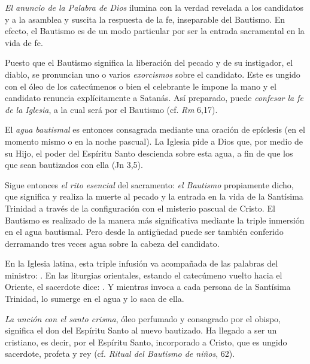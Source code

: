 \begin{ccebody}
 \textit{El anuncio de la Palabra de Dios} ilumina con la verdad revelada a los candidatos y a la asamblea y suscita la respuesta de la fe, inseparable del Bautismo. En efecto, el Bautismo es de un modo particular  por ser la entrada sacramental en la vida de fe.

 Puesto que el Bautismo significa la liberación del pecado y de su instigador, el diablo, se pronuncian uno o varios \textit{exorcismos} sobre el candidato. Este es ungido con el óleo de los catecúmenos o bien el celebrante le impone la mano y el candidato renuncia explícitamente a Satanás. Así preparado, puede \textit{confesar la fe de la Iglesia}, a la cual será  por el Bautismo (cf. \textit{Rm} 6,17).

 El \textit{agua bautismal} es entonces consagrada mediante una oración de epíclesis (en el momento mismo o en la noche pascual). La Iglesia pide a Dios que, por medio de su Hijo, el poder del Espíritu Santo descienda sobre esta agua, a fin de que los que sean bautizados con ella  (Jn 3,5).

 Sigue entonces \textit{el rito esencial} del sacramento: \textit{el Bautismo} propiamente dicho, que significa y realiza la muerte al pecado y la entrada en la vida de la Santísima Trinidad a través de la configuración con el misterio pascual de Cristo. El Bautismo es realizado de la manera más significativa mediante la triple inmersión en el agua bautismal. Pero desde la antigüedad puede ser también conferido derramando tres veces agua sobre la cabeza del candidato.

 En la Iglesia latina, esta triple infusión va acompañada de las palabras del ministro: . En las liturgias orientales, estando el catecúmeno vuelto hacia el Oriente, el sacerdote dice: . Y mientras invoca a cada persona de la Santísima Trinidad, lo sumerge en el agua y lo saca de ella.

 \textit{La unción con el santo crisma}, óleo perfumado y consagrado por el obispo, significa el don del Espíritu Santo al nuevo bautizado. Ha llegado a ser un cristiano, es decir,  por el Espíritu Santo, incorporado a Cristo, que es ungido sacerdote, profeta y rey (cf. \textit{Ritual del Bautismo de niños}, 62).


\end{ccebody}
